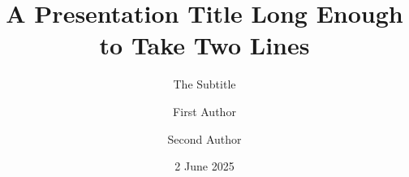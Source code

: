 \documentclass{beamer}
\title{A Presentation Title Long Enough to Take Two Lines}
\subtitle{The Subtitle}
\author{First Author \and Second Author}
\institute{Some Institute}
\date{2 June 2025}
\begin{document}
\begin{frame}
\titlepage
\end{frame}
\frame{\titlepage}
\end{document}
